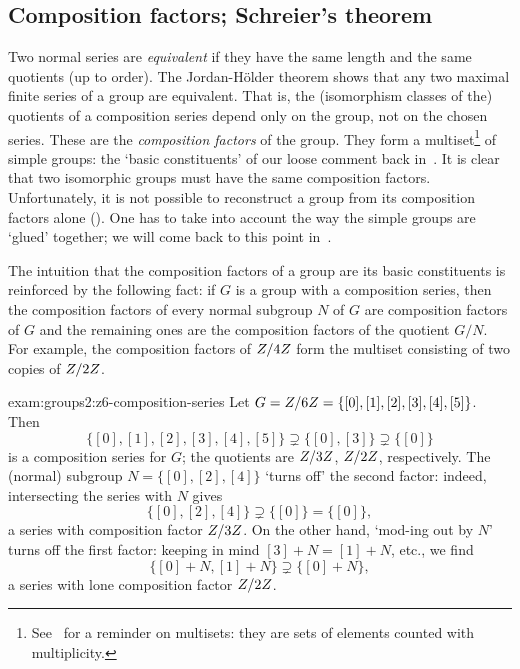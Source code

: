 \subsection{Composition factors; Schreier's theorem}
\label{subsec:groups2:composition-factors-schreier-s-theorem}
Two normal series are \emph{equivalent} if they have the same length
and the same quotients (up to order). The Jordan-H\"older theorem
shows that any two maximal finite series of a group are
equivalent. That is, the (isomorphism classes of the) quotients of a
composition series depend only on the group, not on the chosen
series. These are the \emph{composition factors} of the group. They
form a
multiset\footnote{See~
  for a reminder on multisets: they are sets of elements counted with
  multiplicity.} of simple groups: the `basic constituents' of our
loose comment back in~.  It is
clear that two isomorphic groups must have the same composition
factors.  Unfortunately, it is not possible to reconstruct a group
from its composition factors alone
(). One has
to take into account the way the simple groups are `glued' together;
we will come back to this point
in~.

The intuition that the composition factors of a group are its basic
constituents is reinforced by the following fact: if $G$ is a group
with a composition series, then the composition factors of every
normal subgroup $N$ of $G$ are composition factors of $G$ and the
remaining ones are the composition factors of the quotient $G/N$. For
example, the composition factors of $Z/4Z$ form the multiset
consisting of two copies of $Z/2Z$.
\begin{exam}{}{exam:groups2:z6-composition-series}
  Let $G = Z/6Z = \{[0],[1],[2],[3],[4],[5]\}$. Then
  \[
    \{[0],[1],[2],[3],[4],[5]\} \supsetneq \{[0],[3]\} \supsetneq
    \{[0]\}
  \]
  is a composition series for $G$; the quotients are $Z/3Z$,
  $Z/2Z$, respectively. The (normal) subgroup $N = \{[0],[2],[4]\}$
  `turns off' the second factor: indeed, intersecting the series with
  $N$ gives
  \[
    \{[0],[2],[4]\} \supsetneq \{[0]\} = \{[0]\},
  \]
  a series with composition factor $Z/3Z$. On the other hand,
  `mod-ing out by $N$' turns off the first factor: keeping in mind
  $[3]+N = [1]+N$, etc., we find
  \[
    \{[0]+N,[1]+N\} \supsetneq \{[0]+N\},
  \]
  a series with lone composition factor $Z/2Z$.
\end{exam}

